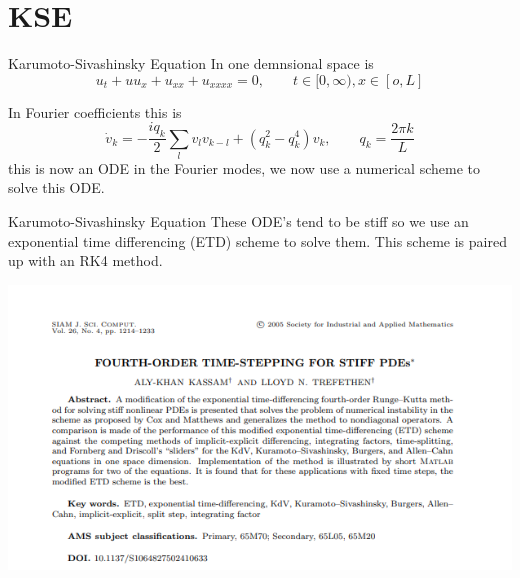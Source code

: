 \documentclass{beamer}  %
\begin{document}
\section{KSE}
\begin{frame}{Karumoto-Sivashinsky Equation}
	In one demnsional space is 
	$$u_t + uu_x + u_{xx} + u_{xxxx} = 0,\qquad t \in [0,\infty), x \in [o,L]$$
	 
In Fourier coefficients this is 
$$\dot{v}_k = -\frac{iq_k}{2}\sum_l v_l v_{k-l} + (q_k^2 - q^4_k)v_k, \qquad q_k = \frac{2\pi k}{L}$$
this is now an ODE in the Fourier modes, we now use a numerical scheme to solve this ODE. 

\end{frame}

\begin{frame}{Karumoto-Sivashinsky Equation}
	These ODE's tend to be stiff so we use an exponential time differencing (ETD) scheme to solve them. This scheme is paired up with an RK4 method.  
	
	 
		\includegraphics[scale=.7]{fig/ETDRK41.png}
\end{frame}
\end{document}
